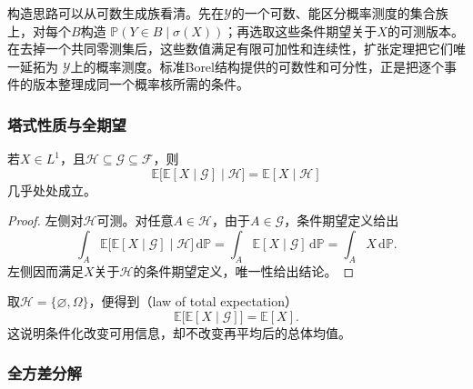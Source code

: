 构造思路可以从可数生成族看清。先在\(\mathcal{Y}\)的一个可数、能区分概率测度的集合族上，对每个\(B\)构造
\(\mathbb{P}(Y\in B\mid\sigma(X))\)；再选取这些条件期望关于\(X\)的可测版本。在去掉一个共同零测集后，这些数值满足有限可加性和连续性，扩张定理把它们唯一延拓为
\(\mathcal{Y}\)上的概率测度。标准Borel结构提供的可数性和可分性，正是把逐个事件的版本整理成同一个概率核所需的条件。

\subsubsection{塔式性质与全期望}

\begin{theorem}[塔式性质]
\label{thm:probability-tower-property}
若\(X\in L^1\)，且\(\mathcal{H}\subseteq\mathcal{G}\subseteq\mathcal{F}\)，则
\[ \mathbb{E}\bigl[\mathbb{E}[X\mid\mathcal{G}]
  \mid\mathcal{H}\bigr]=\mathbb{E}[X\mid\mathcal{H}] \]
几乎处处成立。
\end{theorem}

\begin{proof}
左侧对\(\mathcal{H}\)可测。对任意\(A\in\mathcal{H}\)，由于\(A\in\mathcal{G}\)，条件期望定义给出
\[
  \int_A
  \mathbb{E}\bigl[\mathbb{E}[X\mid\mathcal{G}]
  \mid\mathcal{H}\bigr]\,\mathrm{d}\mathbb{P}
  =
  \int_A\mathbb{E}[X\mid\mathcal{G}]\,\mathrm{d}\mathbb{P}
  =
  \int_A X\,\mathrm{d}\mathbb{P}.
\]
左侧因而满足\(X\)关于\(\mathcal{H}\)的条件期望定义，唯一性给出结论。
\end{proof}

取\(\mathcal{H}=\{\varnothing,\Omega\}\)，便得到（law of total expectation）
\begin{equation}
  \mathbb{E}\bigl[\mathbb{E}[X\mid\mathcal{G}]\bigr]
  =
  \mathbb{E}[X].
  \label{eq:probability-total-expectation}
\end{equation}
这说明条件化改变可用信息，却不改变再平均后的总体均值。

\subsubsection{全方差分解}


